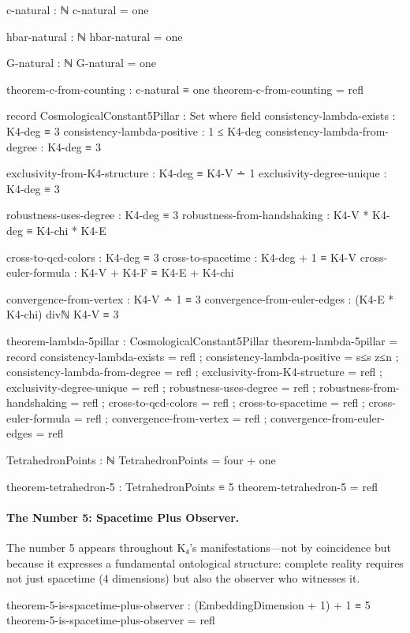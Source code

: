 \documentclass[11pt,a4paper]{book}
\begin{document}
\begin{code}
c-natural : ℕ
c-natural = one

hbar-natural : ℕ
hbar-natural = one

G-natural : ℕ
G-natural = one

theorem-c-from-counting : c-natural ≡ one
theorem-c-from-counting = refl

record CosmologicalConstant5Pillar : Set where
  field
    consistency-lambda-exists : K4-deg ≡ 3
    consistency-lambda-positive : 1 ≤ K4-deg
    consistency-lambda-from-degree : K4-deg ≡ 3
    
    exclusivity-from-K4-structure : K4-deg ≡ K4-V ∸ 1
    exclusivity-degree-unique : K4-deg ≡ 3
    
    robustness-uses-degree : K4-deg ≡ 3
    robustness-from-handshaking : K4-V * K4-deg ≡ K4-chi * K4-E
    
    cross-to-qcd-colors : K4-deg ≡ 3
    cross-to-spacetime : K4-deg + 1 ≡ K4-V
    cross-euler-formula : K4-V + K4-F ≡ K4-E + K4-chi
    
    convergence-from-vertex : K4-V ∸ 1 ≡ 3
    convergence-from-euler-edges : (K4-E * K4-chi) divℕ K4-V ≡ 3

theorem-lambda-5pillar : CosmologicalConstant5Pillar
theorem-lambda-5pillar = record
  { consistency-lambda-exists = refl
  ; consistency-lambda-positive = s≤s z≤n
  ; consistency-lambda-from-degree = refl
  ; exclusivity-from-K4-structure = refl
  ; exclusivity-degree-unique = refl
  ; robustness-uses-degree = refl
  ; robustness-from-handshaking = refl
  ; cross-to-qcd-colors = refl
  ; cross-to-spacetime = refl
  ; cross-euler-formula = refl
  ; convergence-from-vertex = refl
  ; convergence-from-euler-edges = refl
  }

TetrahedronPoints : ℕ
TetrahedronPoints = four + one

theorem-tetrahedron-5 : TetrahedronPoints ≡ 5
theorem-tetrahedron-5 = refl
\end{code}

\paragraph{The Number 5: Spacetime Plus Observer.}

The number 5 appears throughout K₄'s manifestations—not by coincidence but because it expresses a fundamental ontological structure: complete reality requires not just spacetime (4 dimensions) but also the observer who witnesses it.

\begin{code}
theorem-5-is-spacetime-plus-observer : (EmbeddingDimension + 1) + 1 ≡ 5
theorem-5-is-spacetime-plus-observer = refl
\end{code}
\end{document}
